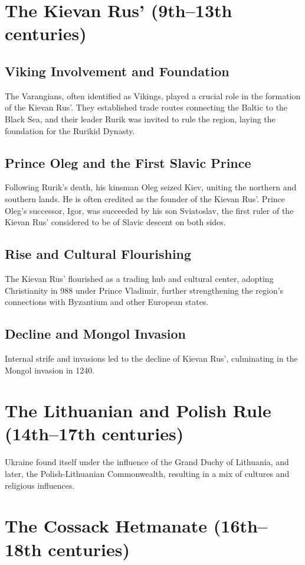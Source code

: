 \documentclass{book}
\begin{document}
\section{The Kievan Rus’ (9th–13th centuries)}
\label{sec:kievan-rus}
\subsection{Viking Involvement and Foundation}
The Varangians, often identified as Vikings, played a crucial role in the formation of the Kievan Rus'. They established trade routes connecting the Baltic to the Black Sea, and their leader Rurik was invited to rule the region, laying the foundation for the Rurikid Dynasty.

\subsection{Prince Oleg and the First Slavic Prince}
Following Rurik’s death, his kinsman Oleg seized Kiev, uniting the northern and southern lands. He is often credited as the founder of the Kievan Rus'. Prince Oleg's successor, Igor, was succeeded by his son Sviatoslav, the first ruler of the Kievan Rus’ considered to be of Slavic descent on both sides.

\subsection{Rise and Cultural Flourishing}
The Kievan Rus’ flourished as a trading hub and cultural center, adopting Christianity in 988 under Prince Vladimir, further strengthening the region's connections with Byzantium and other European states.

\subsection{Decline and Mongol Invasion}
Internal strife and invasions led to the decline of Kievan Rus’, culminating in the Mongol invasion in 1240.

\section{The Lithuanian and Polish Rule (14th–17th centuries)}
\label{sec:lithuanian-polish-rule}
Ukraine found itself under the influence of the Grand Duchy of Lithuania, and later, the Polish-Lithuanian Commonwealth, resulting in a mix of cultures and religious influences.

\section{The Cossack Hetmanate (16th–18th centuries)}
\label{sec:cossack-hetmanate}
\end{document}

